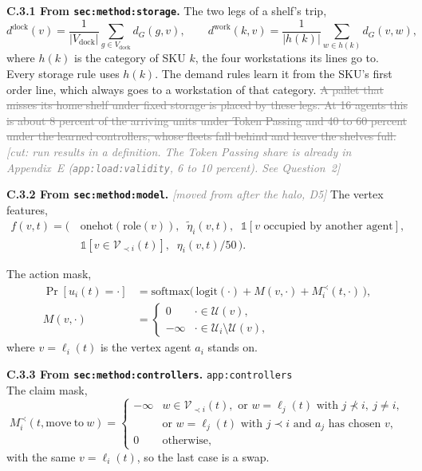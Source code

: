 \documentclass[11pt,a4paper]{article}
\newcommand{\old}[1]{\textcolor{gray}{\sout{#1}}}
\newcommand{\lref}[1]{{\small\texttt{#1}}}
\newcommand{\moved}[1]{{\small\textcolor{gray}{\emph{[moved from #1]}}}}
\newcommand{\cut}[1]{{\small\textcolor{gray}{\emph{[cut: #1]}}}}
\begin{document}
\textbf{C.3.1 From \lref{sec:method:storage}.} The two legs of a shelf's
trip,
\begin{equation}
  d^{\mathrm{dock}}(v) = \frac{1}{|V_{\mathrm{dock}}|} \sum_{g \in V_{\mathrm{dock}}} d_G(g, v),
  \qquad
  d^{\mathrm{work}}(k,v) = \frac{1}{|h(k)|} \sum_{w \in h(k)} d_G(v, w),
  \tag{C.1}
\end{equation}
where $h(k)$ is the category of SKU $k$, the four workstations its lines go
to. Every storage rule uses $h(k)$. The demand rules learn it from the SKU's
first order line, which always goes to a workstation of that category.
\old{A pallet that misses its home shelf under fixed storage is placed by
these legs. At 16 agents this is about 8 percent of the arriving units under
Token Passing and 40 to 60 percent under the learned controllers, whose
fleets fall behind and leave the shelves full.} \cut{run results in a
definition. The Token Passing share is already in Appendix~E
(\lref{app:load:validity}, 6 to 10 percent). See Question~2}

\textbf{C.3.2 From \lref{sec:method:model}.} \moved{after the halo, D5} The
vertex features,
\begin{equation}
  \begin{aligned}
  f(v,t) = \bigl(\, &\mathrm{onehot}(\mathrm{role}(v)),\;\; \tilde\eta_i(v,t),\;\;
                    \mathbb{1}[v \text{ occupied by another agent}],\\
                    &
                    \mathbb{1}[v \in \mathcal{V}_{\prec i}(t)],\;\; \eta_i(v,t)/50 \,\bigr) .
  \end{aligned}
  \tag{C.2}
\end{equation}

The action mask,
\begin{equation}
  \begin{aligned}
  \Pr[u_i(t) = \cdot] &= \mathrm{softmax}\bigl(\, \mathrm{logit}(\cdot) + M(v,\cdot) + M^{\prec}_i(t,\cdot) \,\bigr), \\
  M(v,\cdot) &= \begin{cases} 0 & \cdot \in \mathcal{U}(v), \\
                               -\infty & \cdot \in \mathcal{U}_i\setminus\mathcal{U}(v), \end{cases}
  \end{aligned}
  \tag{C.3}
\end{equation}
where $v = \ell_i(t)$ is the vertex agent $a_i$ stands on.

\textbf{C.3.3 From \lref{sec:method:controllers}.} \hfill\lref{app:controllers}\\
The claim mask,
\begin{equation}
  M^{\prec}_i(t,\mathrm{move\ to\ }w) =
  \begin{cases}
    -\infty & w \in \mathcal{V}_{\prec i}(t), \text{ or } w = \ell_j(t) \text{ with } j \not\prec i,\ j \neq i, \\
            & \text{or } w = \ell_j(t) \text{ with } j \prec i \text{ and } a_j \text{ has chosen } v, \\
    0       & \text{otherwise},
  \end{cases}
  \tag{C.4}
\end{equation}
with the same $v = \ell_i(t)$, so the last case is a swap.
\end{document}
